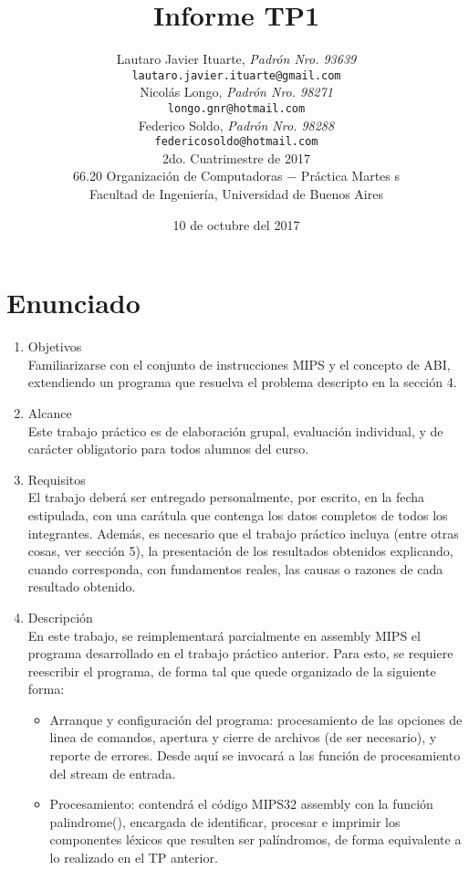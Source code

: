 \documentclass[a4paper,10pt]{article}
\title{		\textbf{Informe TP1}}
\author{	Lautaro Javier Ituarte, \textit{Padrón Nro. 93639}                     \\
            \texttt{ lautaro.javier.ituarte@gmail.com }                                              \\[2.5ex]
			Nicolás Longo, \textit{Padrón Nro. 98271}                     \\
            \texttt{ longo.gnr@hotmail.com }                                              \\[2.5ex]
            Federico Soldo, \textit{Padrón Nro. 98288}                     \\
            \texttt{ federicosoldo@hotmail.com }                                              \\[2.5ex]
            \normalsize{2do. Cuatrimestre de 2017}                                      \\
            \normalsize{66.20 Organización de Computadoras  $-$ Práctica Martes}  s\\
            \normalsize{Facultad de Ingeniería, Universidad de Buenos Aires}            \\
       }
\date{10 de octubre del 2017}
\begin{document}
\maketitle
\thispagestyle{empty}   %
\newpage


\section{Enunciado}

\begin{enumerate}
\item Objetivos \\
Familiarizarse con el conjunto de instrucciones MIPS y el concepto de ABI, extendiendo un programa que resuelva el problema descripto en la
sección 4.
\item Alcance \\
Este trabajo práctico es de elaboración grupal, evaluación individual, y de carácter obligatorio para todos alumnos del curso.

\item Requisitos \\
El trabajo deberá ser entregado personalmente, por escrito, en la fecha estipulada, con una carátula que contenga los datos completos de todos los integrantes. Además, es necesario que el trabajo práctico incluya (entre otras cosas, ver sección 5), la presentación de los resultados obtenidos explicando, cuando corresponda, con fundamentos reales, las causas o razones de cada resultado obtenido.

\item Descripción \\
En este trabajo, se reimplementará parcialmente en assembly MIPS el programa desarrollado en el trabajo práctico anterior. Para esto, se requiere reescribir el programa, de forma tal que quede organizado de la siguiente forma:
\begin{itemize}
\item Arranque y configuración del programa: procesamiento de las opciones de linea de comandos, apertura y  cierre de archivos (de ser necesario), y reporte de errores. Desde aquí se invocará a las función de procesamiento del stream de entrada.
\item Procesamiento: contendrá el código MIPS32 assembly con la función palindrome(), encargada de identificar, procesar e imprimir los componentes léxicos que resulten ser palíndromos, de forma equivalente
a lo realizado en el TP anterior.
\end{itemize}


\end{enumerate}
\end{document}
